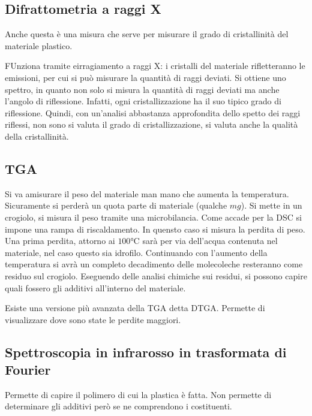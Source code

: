 \subsection{Difrattometria a raggi X}
Anche questa è una misura che serve per misurare il grado di cristallinità del materiale plastico.

FUnziona tramite eirragiamento a raggi X: i cristalli del materiale rifletteranno le emissioni, per cui si può misurare la quantità di raggi deviati.
Si ottiene uno spettro, in quanto non solo si misura la quantità di raggi deviati ma anche l'angolo di riflessione.
Infatti, ogni cristallizzazione ha il suo tipico grado di riflessione.
Quindi, con un'analisi abbastanza approfondita dello spetto dei raggi riflessi, non sono si valuta il grado di cristallizzazione, si valuta anche la qualità della cristallinità.

\subsection{TGA}
Si va amisurare il peso del materiale man mano che aumenta la temperatura.
Sicuramente si perderà un quota parte di materiale (qualche $mg$).
Si mette in un crogiolo, si misura il peso tramite una microbilancia. Come accade per la \ac{DSC} si impone una rampa di riscaldamento. In quensto caso si misura la perdita di peso.
Una prima perdita, attorno ai $100\unit{\celsius}$ sarà per via dell'acqua contenuta nel materiale, nel caso questo sia idrofilo.
Continuando con l'aumento della temperatura si avrà un completo decadimento delle molecoleche resteranno come residuo sul crogiolo.
Eseguendo delle analisi chimiche sui residui, si possono capire quali fossero gli additivi all'interno del materiale.

Esiste una versione più avanzata della \ac{TGA} detta \ac{DTGA}.
Permette di visualizzare dove sono state le perdite maggiori.

\subsection{Spettroscopia in infrarosso in trasformata di Fourier}
Permette di capire il polimero di cui la plastica è fatta. Non permette di determinare gli additivi però se ne comprendono i costituenti.